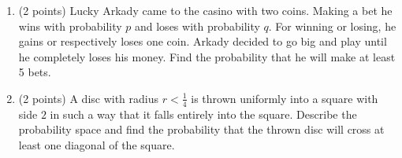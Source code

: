 \documentclass{article}
\begin{document}
\begin{enumerate}
  \item (2 points) Lucky Arkady came to the casino with two coins. 
  Making a bet he wins with probability $p$ and loses with probability $q$. 
  For winning or losing, he gains or respectively loses one coin. 
  Arkady decided to go big and play until he completely loses his money. 
  Find the probability that he will make at least 5 bets.
  
  \item (2 points) A disc with radius $r < \frac{1}{4}$ is thrown 
  uniformly into a square with side $2$ in such a way that it falls 
  entirely into the square. Describe the probability space and 
  find the probability that the thrown disc will cross at least 
  one diagonal of the square.
\end{enumerate}
\end{document}
